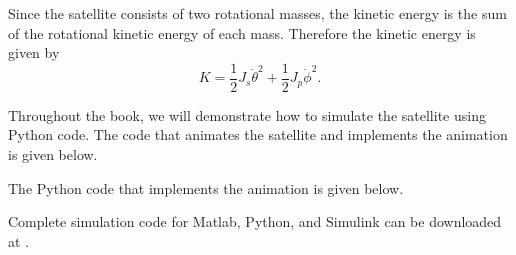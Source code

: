 Since the satellite consists of two rotational masses, the kinetic energy is the sum of the rotational kinetic energy of each mass.  Therefore the kinetic energy is given by
\begin{equation}\label{eq:satellite_kinetic_energy}
K = \frac{1}{2} J_s \dot{\theta}^2 + \frac{1}{2} J_p \dot{\phi}^2.
\end{equation}

Throughout the book, we will demonstrate how to simulate the satellite using
Python code.  The code that animates the satellite and implements the animation is given below.

%



The Python code that implements the animation is given below.




Complete simulation code for Matlab, Python, and Simulink can be downloaded at .





